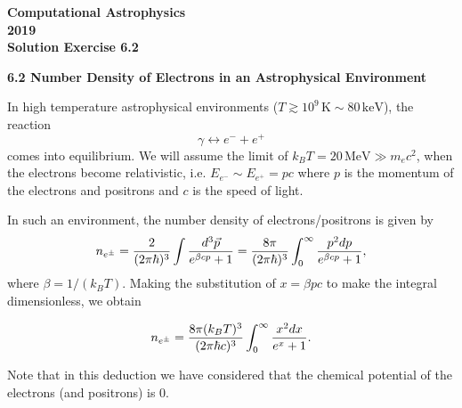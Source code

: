\documentclass[11pt]{article}
\begin{document}
\begin{center}
\large \bf Computational Astrophysics \rm \\
2019\\
{\small Solution Exercise 6.2}
\end{center}


{\bf 6.2 Number Density of Electrons in an Astrophysical Environment}

In high temperature astrophysical environments ($T \gtrsim 10^9\,\mathrm{K} \sim
80\,\mathrm{keV}$), the reaction 
\begin{equation}
\gamma \leftrightarrow e^- + e^+
\end{equation}
comes into equilibrium. We will assume the
limit of $k_B T = 20\,\mathrm{MeV} \gg m_ec^2$, when the electrons
become relativistic, i.e. $E_{e^-} \sim E_{e^+} = pc$ where $p$ is the
momentum of the electrons and positrons and $c$ is the speed of light.

In such an environment, the number density of electrons/positrons is given by
\begin{equation}
n_{e^\pm} = {2 \over (2\pi\hbar)^3}\int { d^3\vec{p} \over
  e^{\beta c p} + 1} = {8\pi \over (2\pi\hbar)^3}\int_0^\infty {p^2 dp \over
  e^{\beta c p} + 1},
\end{equation}
where $\beta = 1/(k_B T)$. Making the substitution of $x= \beta p c$ to make the integral
dimensionless, we obtain

\begin{equation}
n_{e^\pm}  =  {8\pi (k_BT)^3 \over (2\pi\hbar
  c)^3}\int_0^\infty  \frac{x^2 dx}{e^{x} + 1}. \label{eq:ElectronDensity}
\end{equation}
 
 Note that in this deduction we have considered that the chemical potential of the
electrons (and  positrons) is 0.
\end{document}
